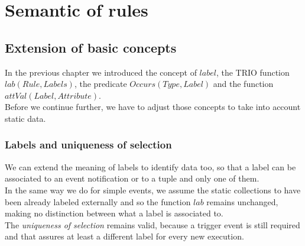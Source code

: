 \newpage

\section{Semantic of rules}

\subsection{Extension of basic concepts}
In the previous chapter we introduced the concept of $label$, the TRIO function $lab(Rule, Labels)$, the predicate $Occurs(Type, Label)$ and the function $attVal(Label, Attribute)$.\\
Before we continue further, we have to adjust those concepts to take into account static data.

\subsubsection{Labels and uniqueness of selection}
We can extend the meaning of labels to identify data too, so that a label can be associated to an event notification or to a tuple and only one of them.\\
In the same way we do for simple events, we assume the static collections to have been already labeled externally and so the function $lab$ remains unchanged, making no distinction between what a label is associated to.\\
The \emph{uniqueness of selection} remains valid, because a trigger event is still required and that assures at least a different label for every new execution.

